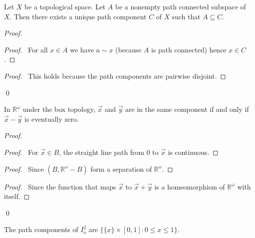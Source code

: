 \begin{prop}
Let $X$ be a topological space. Let $A$ be a nonempty path connected subspace of $X$. Then there exists a unique path component $C$ of $X$ such that $A \subseteq C$.
\end{prop}

\begin{proof}
\pf
{}
\begin{proof}
	\pf\ For all $x \in A$ we have $a \sim x$ (because $A$ is path connected) hence $x \in C$.
\end{proof}
\begin{proof}
	\pf\ This holds because the path components are pairwise disjoint.
\end{proof}
\qed
\end{proof}

\begin{ex}
In $\mathbb{R}^\omega$ under the box topology, $\vec{x}$ and $\vec{y}$ are in the same component if and only if $\vec{x} - \vec{y}$ is eventually zero.
\end{ex}

\begin{proof}
\pf
{}
\begin{proof}
	\pf\ For $\vec{x} \in B$, the straight line path from 0 to $\vec{x}$ is continuous.
\end{proof}
\begin{proof}
	\pf\ Since $(B, \mathbb{R}^\omega - B)$ form a separation of $\mathbb{R}^\omega$.
\end{proof}
\begin{proof}
	\pf\ Since the function that maps $\vec{x}$ to $\vec{x} + \vec{y}$ is a homeomorphism of $\mathbb{R}^\omega$ with itself.
\end{proof}
\qed
\end{proof}

\begin{ex}
The path components of $I_o^2$ are $\{ \{x\} \times [0,1] : 0 \leq x \leq 1 \}$.
\end{ex}


